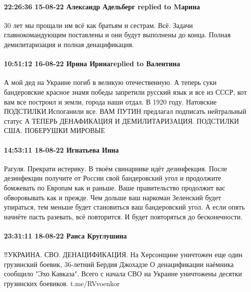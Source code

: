  
 
 
 
 

\paragraph{22:26:36 15-08-22 Александр Адельберг replied to Mарина}

30 лет мы прощали им всё как братьям и сестрам. Всё. Задачи главнокомандующим
поставлены и они будут выполнены до конца.
Полная демилитаризация и полная денацификация.

\paragraph{10:51:12 16-08-22 Ирина Иринаreplied to Валентина}

\obeycr
А мой дед на Украине погиб в великую отечественную.
А теперь суки бандеровские красное знамя победы запретили русский язык и все из СССР, кот вам все построил и земли, города наши отдал. В 1920 году.
Натовские ПОДСТИЛКИ.Испоганили все.
ВАМ ПУТИН предлагал подписать нейтральный статус
А ТЕПЕРЬ ДЕНАФИКАЦИЯ И ДЕМИЛИТАРИЗАЦИЯ.
ПОДСТИЛКИ США.
ПОБЕРУШКИ МИРОВЫЕ
\restorecr

\paragraph{14:53:11 18-08-22 Игнатьева Инна}

Рагуля. Прекрати истерику. В твоём свинарнике идёт дезинфекция.  После
дезинфекции получите от России свой бандеровский угол и продолжите бомжевать по
Европам как и раньше.  Ваше правительство продолжит вас обворовывать как и
прежде.  Чем дольше ваш наркоман Зеленский будет упираться, тем меньше будет
становиться ваш бандеровский угол.  А если опять начнёте пасть разевать, всё
повторится. И будет повторяться до бесконечности. 

\paragraph{23:31:11 18-08-22 Раиса Круглушина}

‼УКРАИНА. СВО. ДЕНАЦИФИКАЦИЯ. На Херсонщине уничтожен еще один грузинский боевик, 36-летний Бердия Джохадзе
О денацификации наёмника сообщило "Эхо Кавказа". Всего с начала СВО на Украине уничтожены десятки грузинских боевиков. t.me/RVvoenkor


